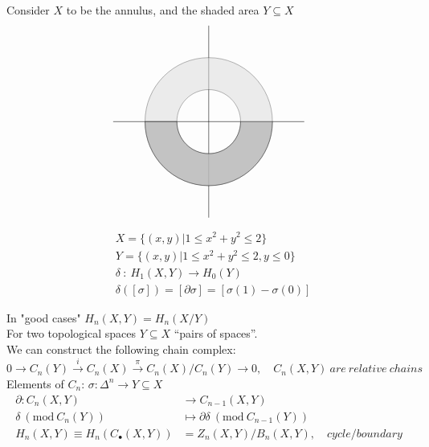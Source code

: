 \documentclass[11pt,a4paper]{report}
\begin{document}
                \begin{Ex} Consider $X$ to be the annulus, and the shaded area $Y \subseteq X$
                \[
                \begin{tikzpicture}
                    \draw (-3,0) -- (3,0);
                    \draw (0,-3) -- (0,3);
                    \filldraw[fill=gray!30,opacity=0.5] (-180:1) arc (-180:180:1) -- (180:2) arc (180:-180:2) -- cycle;
                    \filldraw[fill=black!30,opacity=0.7] (0:1) arc (0:-180:1) -- (-180:2) arc (-180:0:2) -- cycle;

                \end{tikzpicture}
                \]
                    \begin{align*}
                    &X = \{(x,y) | 1 \le x^2 + y^2 \le 2\}\\
                    &Y = \{(x,y) | 1 \le x^2 + y^2 \le 2, y \le 0\}\\
                    &\delta\ :\ H_1(X,Y) \rightarrow H_0(Y)\\
                    &\delta([\sigma]) = [\partial \sigma] = [\sigma(1) - \sigma(0)]
                    \end{align*}
                \end{Ex}

                In "good cases" $H_n(X,Y) = H_n(X/Y)$ \\


                For two topological spaces $Y \subseteq X$ ``pairs of spaces''.\\
                We can construct the following chain complex: \\
                $0 \rightarrow C_n(Y) \xrightarrow{i} C_n(X) \xrightarrow{\pi} C_n(X) / C_n(Y) \rightarrow 0, \quad C_n(X, Y)\ are\ relative\ chains$ \\
                Elements of $C_n$: $\sigma: \Delta^n \rightarrow Y \subseteq X$ \\

                \newcommand{\Mod}[1]{\ (\mathrm{mod}\ #1)}
                \begin{align*}
                  \partial: C_n(X,Y) &\rightarrow C_{n-1}(X, Y)\\
                  \delta \Mod{C_n(Y)} &\mapsto \partial \delta \Mod{C_{n-1}(Y)}\\
                  H_n(X, Y) \equiv H_n(C_\bullet(X, Y)) &= Z_n(X, Y) / B_n(X, Y),\quad cycle / boundary\\
                \end{align*}
\end{document}
